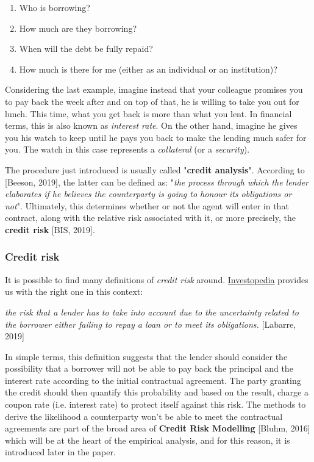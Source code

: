 \documentclass[a4paper,12pt]{article}
\begin{document}
        \begin{enumerate} \item Who is borrowing? \item How much are they borrowing? \item When will the debt be fully repaid? \item How much is there for me (either as an individual or an institution)?
        \end{enumerate}
    
    Considering the last example, imagine instead that your colleague promises you to pay back the week after and on top of that,
    he is willing to take you out for lunch. This time, what you get back is more than what you lent. 
    In financial terms, this is also known as \textit{interest rate}. On the other hand, imagine he gives you his watch to keep 
    until he pays you back to make the lending much safer for you. The watch in this case represents a \textit{collateral} 
    (or a \textit{security}).

    The procedure just introduced is usually called "\textbf{credit analysis}". According to [Beeson, 2019], 
    the latter can be defined as: "\textit{the process through which the lender elaborates if he believes the counterparty is going to honour its obligations or not}". 
    Ultimately, this determines whether or not the agent will enter in that contract, 
    along with the relative risk associated with it, or more precisely, the \textbf{credit risk} [BIS, 2019].

    \subsubsection{Credit risk}

    It is possible to find many definitions of \textit{credit risk} around.
    \href{https://www.investopedia.com/}{Investopedia} provides us with the right one in this context:
 
        \begin{definition} \textit{the risk that a lender has to take into account due to the uncertainty related to the borrower either failing to repay a loan or to meet its obligations.} [Labarre, 2019]
        \end{definition}

    In simple terms, this definition suggests that the lender should consider the possibility that a borrower 
    will not be able to pay back the principal and the interest rate according to the initial contractual agreement. 
    The party granting the credit should then quantify this probability and based on the result, 
    charge a coupon rate (i.e. interest rate) to protect itself against this risk. 
    The methods to derive the likelihood a counterparty won't be able to meet the contractual agreements are 
    part of the broad area of \textbf{Credit Risk Modelling} [Bluhm, 2016]  
    which will be at the heart of the empirical analysis, and for this reason, it is introduced later in the paper. 
        
\end{document}

